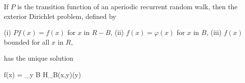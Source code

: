 If $P$ is the transition function of an aperiodic recurrent random walk, then the exterior Dirichlet problem, defined by

(i) $Pf(x) = f(x)$ for $x$ in $R - B$,
(ii) $f(x) = \varphi(x)$ for $x$ in $B$,
(iii) $f(x)$ bounded for all $x$ in $R$,

has the unique solution

$$f(x) = \sum_{y \in B} H_B(x,y)\varphi(y)